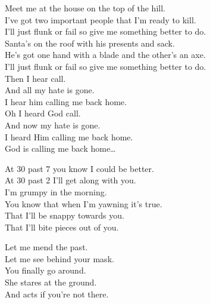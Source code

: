 


Meet me at the house on the top of the hill. \\
I've got two important people that I'm ready to kill. \\
I'll just flunk or fail so give me something better to do. \\

Santa's on the roof with his presents and sack. \\
He's got one hand with a blade and the other's an axe. \\
I'll just flunk or fail so give me something better to do. \\

Then I hear  call. \\
And all my hate is gone. \\
I hear him calling me back home. \\

Oh I heard God call. \\
And now my hate is gone. \\
I heard Him calling me back home. \\

God is calling me back home… \\




At 30 past 7 you know I could be better. \\
At 30 past 2 I'll get along with you. \\
I'm grumpy in the morning. \\
You know that when I'm yawning it's true. \\

That I'll be snappy towards you. \\
That I'll bite pieces out of you. \\




Let me mend the past. \\
Let me see behind your mask. \\
You finally go around. \\
She stares at the ground. \\
And acts if you're not there. \\

